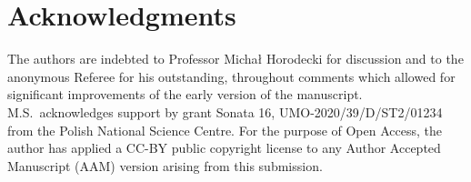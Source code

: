 \documentclass[reqno]{amsart}
\theoremstyle{plain}
\theoremstyle{note}
\begin{document}
\section*{Acknowledgments}
The authors are indebted to Professor Micha{\l} Horodecki for discussion and to the anonymous Referee for his outstanding, throughout comments which allowed for significant improvements of the early version of the manuscript. M.S.~acknowledges support by grant Sonata 16, UMO-2020/39/D/ST2/01234 from the Polish National Science Centre. For the purpose of Open Access, the author has applied a CC-BY public copyright license to any Author Accepted Manuscript (AAM) version arising from this submission.



\end{document}
